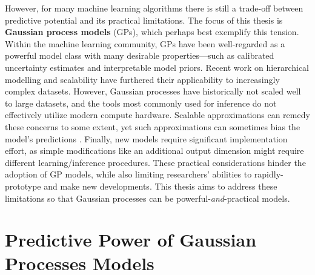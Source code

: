 However, for many machine learning algorithms there is still a trade-off between predictive potential and its practical limitations.
The focus of this thesis is {\bf Gaussian process models} (GPs), which perhaps best exemplify this tension.
Within the machine learning community, GPs have been well-regarded as a powerful model class with many desirable properties---such as calibrated uncertainty estimates and interpretable model priors.
Recent work on hierarchical modelling \citep[e.g.][]{damianou2013deep} and scalability \citep[e.g.][]{wilson2015kernel} have furthered their applicability to increasingly complex datasets.
However, Gaussian processes have historically not scaled well to large datasets, and the tools most commonly used for inference do not effectively utilize modern compute hardware.
Scalable approximations can remedy these concerns to some extent, yet such approximations can sometimes bias the model's predictions \cite{turner2011two,bauer2016understanding}.
Finally, new models require significant implementation effort, as simple modifications like an additional output dimension might require different learning/inference procedures.
These practical considerations hinder the adoption of GP models, while also limiting researchers' abilities to rapidly-prototype and make new developments.
This thesis aims to address these limitations so that Gaussian processes can be powerful-\emph{and}-practical models.


\section{Predictive Power of Gaussian Processes Models}

